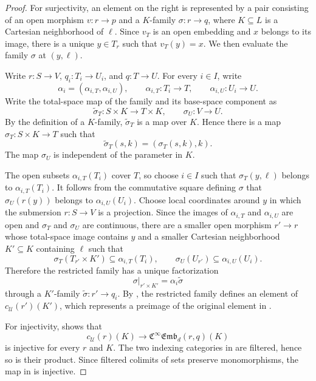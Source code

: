 \documentclass{amsart}
\newcommand{\femb}[1]{\mathfrak{C}^{\infty}\mathfrak{Emb}_{#1}}
\theoremstyle{definition}
\numberwithin{equation}{subsection}
\numberwithin{subsubsection}{subsection}
\begin{document}
\begin{proof}
  For surjectivity, an element on the right is represented by a pair
  consisting of an open morphism \(v:r\to p\) and a \(K\)-family
  \(\sigma:r\to q\), where \(K\subseteq L\) is a Cartesian neighborhood of
  \(\ell\). Since \(v_T\) is an open embedding and \(x\) belongs to its
  image, there is a unique \(y\in T_r\) such that \(v_T(y)=x\). We then
  evaluate the family \(\sigma\) at \((y,\ell)\).

  Write \(r:S\to V\), \(q_i:T_i\to U_i\), and \(q:T\to U\). For every
  \(i\in I\), write
  \[
    \alpha_i=(\alpha_{i,T},\alpha_{i,U}),
    \qquad
    \alpha_{i,T}:T_i\longrightarrow T,
    \qquad
    \alpha_{i,U}:U_i\longrightarrow U.
  \]
  Write the total-space map of the family and its base-space component as
  \[
    \widetilde{\sigma}_T:S\times K\longrightarrow T\times K,
    \qquad
    \sigma_U:V\longrightarrow U.
  \]
  By the definition of a \(K\)-family, \(\widetilde{\sigma}_T\) is a map
  over \(K\). Hence there is a map \(\sigma_T:S\times K\to T\) such that
  \[
    \widetilde{\sigma}_T(s,k)=(\sigma_T(s,k),k).
  \]
  The map \(\sigma_U\) is independent of the parameter in \(K\).

  The open subsets \(\alpha_{i,T}(T_i)\) cover \(T\), so choose \(i\in I\) such
  that \(\sigma_T(y,\ell)\) belongs to \(\alpha_{i,T}(T_i)\). It follows from
  the commutative square defining
  \(\sigma\) that \(\sigma_U(r(y))\) belongs to \(\alpha_{i,U}(U_i)\). Choose
  local coordinates around \(y\) in which the submersion \(r:S\to V\) is a
  projection. Since the images of \(\alpha_{i,T}\) and \(\alpha_{i,U}\) are open
  and
  \(\sigma_T\) and \(\sigma_U\) are continuous, there are a smaller open
  morphism \(r'\to r\) whose total-space image contains \(y\) and a smaller
  Cartesian neighborhood \(K'\subseteq K\) containing \(\ell\) such that
  \[
    \sigma_T(T_{r'}\times K')
    \subseteq \alpha_{i,T}(T_i),
    \qquad
    \sigma_U(U_{r'})\subseteq \alpha_{i,U}(U_i).
  \]
  Therefore the restricted family has a unique factorization
  \[
    \sigma|_{r'\times K'}
    =\alpha_i\widetilde\sigma
  \]
  through a \(K'\)-family \(\widetilde\sigma:r'\to q_i\). By
  , the restricted family defines an
  element of \(c_{\mathcal{U}}(r')(K')\), which represents a preimage of the
  original element in
  .

  For injectivity,  shows that
  \[
    c_{\mathcal{U}}(r)(K)\longrightarrow\femb{d}(r,q)(K)
  \]
  is injective for every \(r\) and \(K\). The two indexing categories in
   are filtered, hence so
  is their product. Since filtered colimits of sets preserve monomorphisms,
  the map in  is
  injective.


\end{proof}
\end{document}
